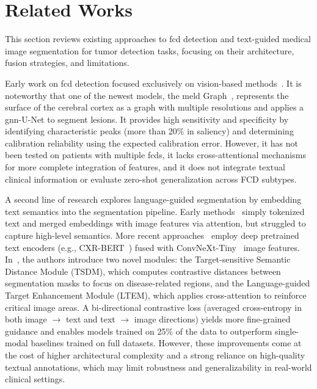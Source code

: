 \documentclass[FCD_GNN.tex]{subfiles}
\begin{document}
\chapter{Related Works}
\label{chapter:Related_works}

This section reviews existing approaches to \ac{fcd} detection and text-guided medical image segmentation for tumor detection 
tasks, focusing on their architecture, fusion strategies, and limitations.

Early work on \ac{fcd} detection focused exclusively on vision-based methods~\cite{Durgam2025LungCancer, Abdusalomov2023BrainTumor, Sharma2025KidneyCT, Mehmood2025BreastCancer}. 
It is noteworthy that one of the newest models, the \ac{meld} Graph~\cite{Ripart2025MELD}, represents the surface of the cerebral cortex as a graph with multiple resolutions and applies a \ac{gnn}-U-Net to segment lesions. It provides high 
sensitivity and specificity by identifying characteristic peaks (more than 20\% in saliency) and determining calibration reliability using the expected 
calibration error. However, it has not been tested on patients with multiple \ac{fcd}s, it lacks cross-attentional mechanisms for more complete integration of 
features, and it does not integrate textual clinical information or evaluate zero-shot generalization across FCD subtypes.

A second line of research explores language-guided segmentation by embedding text semantics into the segmentation pipeline. 
Early methods~\cite{Tomar2022TGANet, Li2023LViT} simply tokenized text and merged embeddings with image features via attention, 
but struggled to capture high-level semantics. 
More recent approaches~\cite{Lee2023TextGuided, Zhong2023Ariadne} employ deep pretrained text encoders (e.g., CXR-BERT~\cite{CXR-BERT}) fused with ConvNeXt-Tiny~\cite{Liu2022ConvNeXt} image features. 
In~\cite{Li2024LGMSeg}, the authors introduce two novel modules: the Target-sensitive Semantic Distance Module (TSDM), 
which computes contrastive distances between segmentation masks to focus on disease-related regions, 
and the Language-guided Target Enhancement Module (LTEM), which applies cross-attention to reinforce critical image areas. 
A bi-directional contrastive loss (averaged cross-entropy in both image $\rightarrow$ text and text $\rightarrow$ image directions) yields more fine-grained guidance 
and enables models trained on 25\% of the data to outperform single-modal baselines trained on full datasets. 
However, these improvements come at the cost of higher architectural complexity and a strong reliance on high-quality textual annotations, 
which may limit robustness and generalizability in real-world clinical settings.
\end{document}
